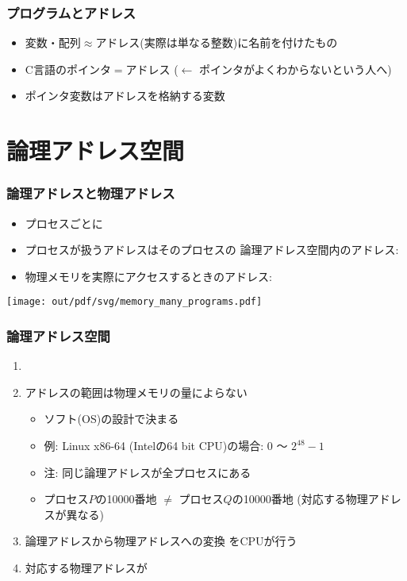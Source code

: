 \documentclass[12pt,dvipdfmx]{beamer}
\begin{document}
\begin{frame}[fragile]
  \frametitle{プログラムとアドレス}
  \begin{itemize}
  \item 変数・配列$\approx$アドレス(実際は単なる整数)に名前を付けたもの
  \item C言語のポインタ$=$アドレス
    ($\leftarrow$ ポインタがよくわからないという人へ)
  \item ポインタ変数はアドレスを格納する変数
  \end{itemize}
\end{frame}

\section{論理アドレス空間}

\begin{frame}
  \frametitle{論理アドレスと物理アドレス}
  \begin{itemize}
  \item プロセスごとに
  \item プロセスが扱うアドレスはそのプロセスの
    論理アドレス空間内のアドレス:
  \item 物理メモリを実際にアクセスするときのアドレス: 
  \end{itemize}
  \begin{center}
    \texttt{[image: out/pdf/svg/memory\_many\_programs.pdf]}
  \end{center}
\end{frame}

\begin{frame}
  \frametitle{論理アドレス空間}
  \begin{enumerate}
  \item {}
  \item アドレスの範囲は物理メモリの量によらない
    \begin{itemize}
    \item ソフト(OS)の設計で決まる
    \item 例: Linux x86-64 (Intelの64 bit CPU)の場合: 0 〜 $2^{48} - 1$
    \item 注: 同じ論理アドレスが全プロセスにある
    \item プロセス$P$の10000番地 $\neq$ プロセス$Q$の10000番地
      (対応する物理アドレスが異なる)
    \end{itemize}
  \item 論理アドレスから物理アドレスへの変換
    をCPUが行う
  \item 対応する物理アドレスが
  \end{enumerate}
\end{frame}
\end{document}
